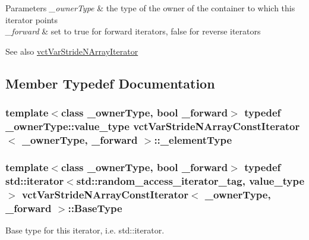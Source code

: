 \begin{DoxyParams}{Parameters}
{\em \+\_\+owner\+Type} & the type of the owner of the container to which this iterator points \\
\hline
{\em \+\_\+forward} & set to true for forward iterators, false for reverse iterators\\
\hline
\end{DoxyParams}
\begin{DoxySeeAlso}{See also}
\hyperlink{classvct_var_stride_n_array_iterator}{vct\+Var\+Stride\+N\+Array\+Iterator} 
\end{DoxySeeAlso}


\subsection{Member Typedef Documentation}
\hypertarget{classvct_var_stride_n_array_const_iterator_adb02654cc147e6ce3ceef03ebe78c4e2}{}
\subsubsection[{\+\_\+element\+Type}]{\setlength{\rightskip}{0pt plus 5cm}template$<$class \+\_\+owner\+Type, bool \+\_\+forward$>$ typedef \+\_\+owner\+Type\+::value\+\_\+type {\bf vct\+Var\+Stride\+N\+Array\+Const\+Iterator}$<$ \+\_\+owner\+Type, \+\_\+forward $>$\+::{\bf \+\_\+element\+Type}}\label{classvct_var_stride_n_array_const_iterator_adb02654cc147e6ce3ceef03ebe78c4e2}
\hypertarget{classvct_var_stride_n_array_const_iterator_a7aa82e6a4135b2dca6679c1253c9aa34}{}
\subsubsection[{Base\+Type}]{\setlength{\rightskip}{0pt plus 5cm}template$<$class \+\_\+owner\+Type, bool \+\_\+forward$>$ typedef std\+::iterator$<$std\+::random\+\_\+access\+\_\+iterator\+\_\+tag, value\+\_\+type$>$ {\bf vct\+Var\+Stride\+N\+Array\+Const\+Iterator}$<$ \+\_\+owner\+Type, \+\_\+forward $>$\+::{\bf Base\+Type}}\label{classvct_var_stride_n_array_const_iterator_a7aa82e6a4135b2dca6679c1253c9aa34}
Base type for this iterator, i.\+e. std\+::iterator. \hypertarget{classvct_var_stride_n_array_const_iterator_a09142c21a89b54a40ad29eb7972c6f78}{}
